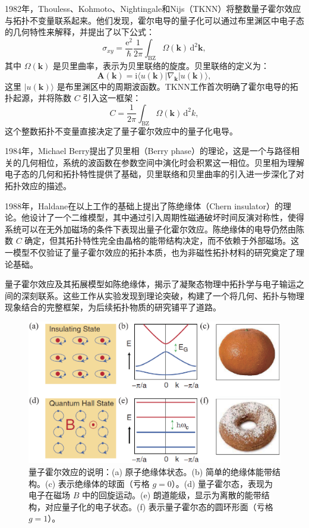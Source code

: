 1982年，Thouless、Kohmoto、Nightingale和Nijs（TKNN）将整数量子霍尔效应与拓扑不变量联系起来\cite{d3}。他们发现，霍尔电导的量子化可以通过布里渊区中电子态的几何特性来解释，并提出了以下公式：
\begin{equation} \label{eq1-3}
\sigma_{xy} = \frac{\mathrm{e}^2}{\hbar} \frac{1}{2\pi} \int_{\mathrm{BZ}} \Omega(\mathbf{k}) \, \mathrm{d}^2\mathbf{k},
\end{equation}
其中 \( \Omega(\mathbf{k}) \) 是贝里曲率，表示为贝里联络的旋度。贝里联络的定义为：
\begin{equation} \label{eq1-4}
    \mathbf{A}(\mathbf{k}) = \mathrm{i} \langle u(\mathbf{k}) | \nabla_{\mathbf{k}} | u(\mathbf{k}) \rangle,
\end{equation}
这里 \( |u(\mathbf{k})\rangle \) 是布里渊区中的周期波函数。TKNN工作首次明确了霍尔电导的拓扑起源，并将陈数 \( C \) 引入这一框架：
\begin{equation} \label{eq1-5}
    C = \frac{1}{2\pi} \int_\mathrm{BZ} \Omega(\mathbf{k}) \, \mathrm{d}^2k,
\end{equation}
这个整数拓扑不变量直接决定了量子霍尔效应中的量子化电导。

1984年，Michael Berry提出了贝里相（Berry phase）的理论\cite{d4}，这是一个与路径相关的几何相位，系统的波函数在参数空间中演化时会积累这一相位。贝里相为理解电子态的几何和拓扑特性提供了基础，贝里联络和贝里曲率的引入进一步深化了对拓扑效应的描述。

1988年，Haldane在以上工作的基础上提出了陈绝缘体（Chern insulator）的理论\cite{d5}。他设计了一个二维模型，其中通过引入周期性磁通破坏时间反演对称性，使得系统可以在无外加磁场的条件下表现出量子化霍尔效应。陈绝缘体的电导仍然由陈数 \( C \) 确定，但其拓扑特性完全由晶格的能带结构决定，而不依赖于外部磁场。这一模型不仅验证了量子霍尔效应的拓扑本质，也为非磁性拓扑材料的研究奠定了理论基础。

量子霍尔效应及其拓展模型如陈绝缘体，揭示了凝聚态物理中拓扑学与电子输运之间的深刻联系。这些工作从实验发现到理论突破，构建了一个将几何、拓扑与物理现象结合的完整框架，为后续拓扑物质的研究铺平了道路。

\begin{figure}[h!]
    \centering
    \includegraphics[width=1\textwidth]{images/fig1-2.eps} 
    \caption{量子霍尔效应的说明：(a) 原子绝缘体状态。(b) 简单的绝缘体能带结构。(c) 表示绝缘体的球面（亏格 \( g=0 \)）。(d) 量子霍尔态，表现为电子在磁场 \( B \) 中的回旋运动。(e) 朗道能级，显示为离散的能带结构，对应量子化的电子状态。(f) 表示量子霍尔态的圆环形面（亏格 \( g=1 \)）\cite{r11}。}
    \label{fig_1_2}
\end{figure}


